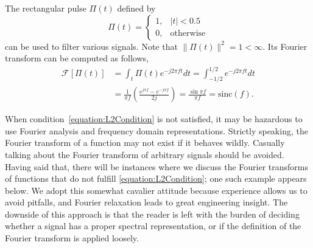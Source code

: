 \begin{example}
The rectangular pulse $\Pi (t)$ defined by
\begin{equation*}
\Pi (t) = \begin{cases} 1, & |t| < 0.5 \\
0, & \text{otherwise} \end{cases}
\end{equation*}
can be used to filter various signals.
Note that $\| \Pi (t) \|^2 = 1 < \infty$.
Its Fourier transform can be computed as follows,
\begin{equation*}
\begin{split}
\mathcal{F} \left[ \Pi(t) \right]
&= \int_t \Pi (t) e^{- j 2 \pi f t} dt
= \int_{-1/2}^{1/2} e^{- j 2 \pi f t} dt \\
&= \frac{1}{\pi f} \left( \frac{e^{j \pi f} - e^{- j \pi f}}{2j} \right)
= \frac{ \sin \pi f }{\pi f} = \mathrm{sinc}(f) .
\end{split}
\end{equation*}
\end{example}

When condition~\eqref{equation:L2Condition} is not satisfied, it may be hazardous to use Fourier analysis and frequency domain representations.
Strictly speaking, the Fourier transform of a function may not exist if it behaves wildly.
Casually talking about the Fourier transform of arbitrary signals should be avoided.
Having said that, there will be instances where we discuss the Fourier transforms of functions that do not fulfill \eqref{equation:L2Condition};
one such example appears below.
We adopt this somewhat cavalier attitude because experience allows us to avoid pitfalls, and Fourier relaxation leads to great engineering insight.
The downside of this approach is that the reader is left with the burden of deciding whether a signal has a proper spectral representation, or if the definition of the Fourier transform is applied loosely.

